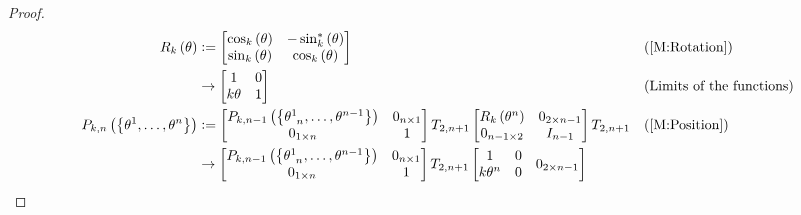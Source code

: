 \documentclass[../main.tex]{subfiles}
\begin{document}
\begin{proof}
    \begin{align*}
        R_k\left(\theta\right)
        &\defeq\begin{bmatrix}
            \cos_k\left(\theta\right) & -\sin_k^\ast\left(\theta\right) \\
            \sin_k\left(\theta\right) & \cos_k\left(\theta\right) \\
        \end{bmatrix} && \text{(\cref{M:Rotation})} \\
        &\to\begin{bmatrix}
            1 & 0 \\
            k\theta & 1 \\
        \end{bmatrix} && \text{(Limits of the functions)} \\
        P_{k,n}\left(\left\{\tensor{\theta}{^1},\dots,\tensor{\theta}{^n}\right\}\right)
        &\defeq
        \begin{bmatrix}
            P_{k,n-1}\left(\left\{\tensor{\theta}{^1_{n}},\dots,\tensor{\theta}{^{n-1}}\right\}\right) & 0_{n\times 1} \\
            0_{1\times n}                                                                              & 1             \\
        \end{bmatrix}
        T_{2,n+1}
        \begin{bmatrix}
            R_k\left(\tensor{\theta}{^n}\right) & 0_{{2}\times{n-1}} \\
            0_{{n-1}\times{2}}                  & {I}_{n-1}          \\
        \end{bmatrix}
        T_{2,n+1} && \text{(\cref{M:Position})} \\
        &\to
        \begin{bmatrix}
            P_{k,n-1}\left(\left\{\tensor{\theta}{^1_{n}},\dots,\tensor{\theta}{^{n-1}}\right\}\right) & 0_{n\times 1} \\
            0_{1\times n}                                                                              & 1             \\
        \end{bmatrix}
        T_{2,n+1}
        \begin{bmatrix}
            \begin{matrix*}1&0\\k\tensor{\theta}{^n}&0\\\end{matrix*} & 0_{{2}\times{n-1}} \\

\end{bmatrix}
\end{align*}
\end{proof}
\end{document}
